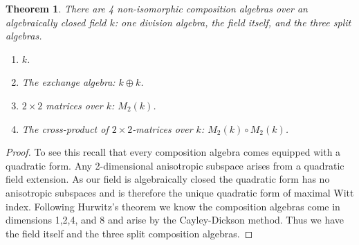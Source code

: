 \documentclass[12pt]{article}
\newtheorem{thm}{Theorem}
\begin{document}
\begin{thm}
There are 4 non-isomorphic composition algebras over an algebraically closed field $k$:
one division algebra, the field itself, and the three split algebras.
\begin{enumerate}
\item $k$.
\item The \emph{exchange} algebra: $k\oplus k$.
\item $2\times 2$ matrices over $k$: $M_2(k)$.
\item The cross-product of $2\times 2$-matrices over $k$: $M_2(k)\circ M_2(k)$.
\end{enumerate}
\end{thm}
\begin{proof}
To see this recall that every composition algebra comes equipped with a quadratic form.
Any 2-dimensional anisotropic subspace arises from a quadratic field extension.  As
our field is algebraically closed the quadratic form has no anisotropic subspaces and
is therefore the unique quadratic form of maximal Witt index.  Following Hurwitz's theorem
we know the composition algebras come in dimensions 1,2,4, and 8 and arise by the 
Cayley-Dickson method.  Thus we have the field itself and the three split
composition algebras.
\end{proof}
\end{document}
